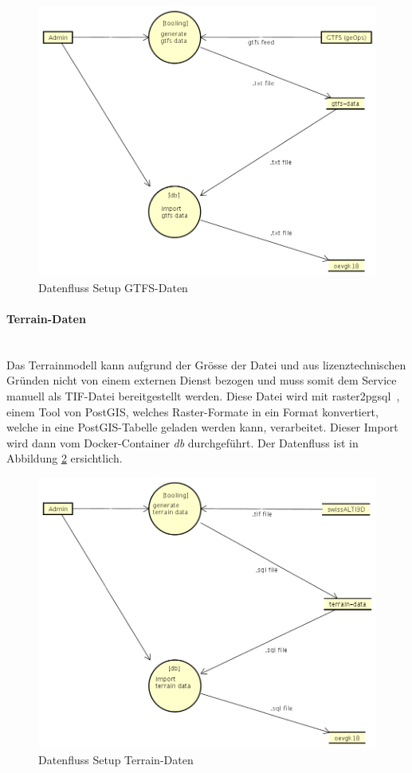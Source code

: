 \begin{figure}[ht]
    \centering
    \includegraphics[width=0.8\linewidth]{projectdoc/img/dataflow-docker-setup-gtfs-data.png}
    \caption[Datenfluss Setup GTFS-Daten]{Datenfluss Setup GTFS-Daten}
    \label{fig:dataflow-docker-setup-gtfs-data}
\end{figure}

\paragraph{Terrain-Daten}~\\
Das Terrainmodell kann aufgrund der Grösse der Datei und aus lizenztechnischen Gründen nicht von einem externen Dienst bezogen und muss somit dem Service manuell als TIF-Datei bereitgestellt werden.
Diese Datei wird mit raster2pgsql~\cite{raster2pgsql}, einem Tool von PostGIS, welches Raster-Formate in ein Format konvertiert, welche in eine PostGIS-Tabelle geladen werden kann, verarbeitet.
Dieser Import wird dann vom Docker-Container \emph{db} durchgeführt.
Der Datenfluss ist in Abbildung \ref{fig:dataflow-docker-setup-terrain-data} ersichtlich.

\begin{figure}[ht]
    \centering
    \includegraphics[width=0.8\linewidth]{projectdoc/img/dataflow-docker-setup-terrain-data.png}
    \caption[Datenfluss Setup Terrain-Daten]{Datenfluss Setup Terrain-Daten}
    \label{fig:dataflow-docker-setup-terrain-data}
\end{figure}

